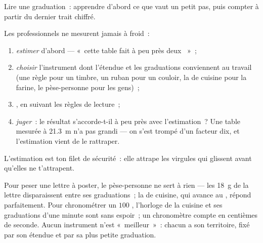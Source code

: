 \begin{omfigure}

{\small Lire une graduation~: apprendre d'abord ce que vaut un petit
pas, puis compter à partir du dernier trait chiffré.}
\end{omfigure}

\begin{method}\label{met:g6:measurement-in-science:estimate}
Les professionnels ne mesurent jamais à froid~:
\begin{enumerate}
  \item \emph{estimer} d'abord --- «~cette table fait à peu près
        deux ~»~;
  \item \emph{choisir} l'instrument dont l'étendue et les
        graduations conviennent au travail (une règle pour un
        timbre, un  ruban pour un couloir, la  de
        cuisine pour la farine, le pèse-personne pour les gens)~;
  \item \emph{}, en suivant les règles de lecture~;
  \item \emph{juger}~: le résultat s'accorde-t-il à peu près avec
        l'estimation~? Une table mesurée à \qty{21.3}{m} n'a pas
        grandi --- on s'est trompé d'un facteur dix, et l'estimation
        vient de le rattraper.
\end{enumerate}
L'estimation est ton filet de sécurité~: elle attrape les virgules
qui glissent avant qu'elles ne t'attrapent.
\end{method}

\begin{example}\label{ex:g6:measurement-in-science:choose}
Pour peser une lettre à poster, le pèse-personne ne sert à rien ---
les \qty{18}{g} de la lettre disparaissent entre ses graduations~; la
 de cuisine, qui avance au , répond parfaitement. Pour
chronométrer un $100$ , l'horloge de la cuisine et ses
graduations d'une minute sont sans espoir~; un chronomètre compte en
centièmes de seconde. Aucun instrument n'est «~meilleur~»~: chacun a
son territoire, fixé par son étendue et par sa plus petite
graduation.
\end{example}

